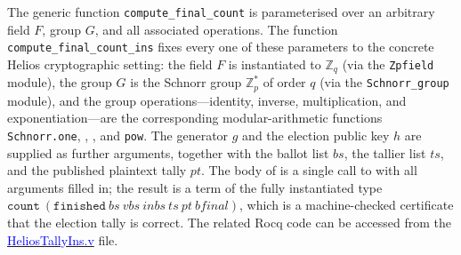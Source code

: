 The generic function \texttt{compute\_final\_count} is parameterised over an
arbitrary field $F$, group $G$, and all associated operations.
The function \texttt{compute\_final\_count\_ins} fixes every one of these
parameters to the concrete Helios cryptographic setting: the field $F$ is
instantiated to $\mathbb{Z}_q$ (via the \texttt{Zpfield} module), the group
$G$ is the Schnorr group $\mathbb{Z}^*_p$ of order $q$ (via the
\texttt{Schnorr\_group} module), and the group operations---identity,
inverse, multiplication, and exponentiation---are the corresponding
modular-arithmetic functions \texttt{Schnorr.one}, \texttt{},
\texttt{}, and \texttt{pow}.
The generator $g$ and the election public key $h$
are supplied as further arguments, together with the ballot list $\mathit{bs}$,
the tallier list $\mathit{ts}$, and the published plaintext tally
$\mathit{pt}$.
The body of \texttt{} is a single call to
\texttt{} with all arguments filled in; the result is a
term of the fully instantiated type
$\texttt{count}~(\texttt{finished}~\mathit{bs}~\mathit{vbs}~\mathit{inbs}~\mathit{ts}~\mathit{pt}~\mathit{bfinal})$,
which is a machine-checked certificate that the election tally is correct. The related Rocq code can be accessed from  the 
\href{https://anonymous.4open.science/r/SigmaProtocol-EBA5/src/Examples/HeliosTallyIns.v}{\textcolor{blue}{HeliosTallyIns.v}} file.


